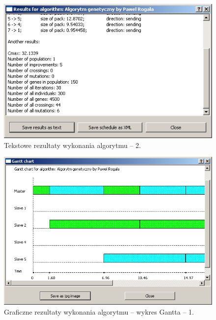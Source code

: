 \begin{figure}[htp]
\centering\includegraphics[scale=1]{figures/screens/text_results2.png}
\caption{Tekstowe rezultaty wykonania algorytmu -- 2.}\label{rys:text_results2}
\end{figure}

\begin{figure}[htp]
\centering\includegraphics[scale=0.75]{figures/screens/chart_results1.png}
\caption{Graficzne rezultaty wykonania algorytmu -- wykres Gantta -- 1.}\label{rys:chart_results1}
\end{figure}

